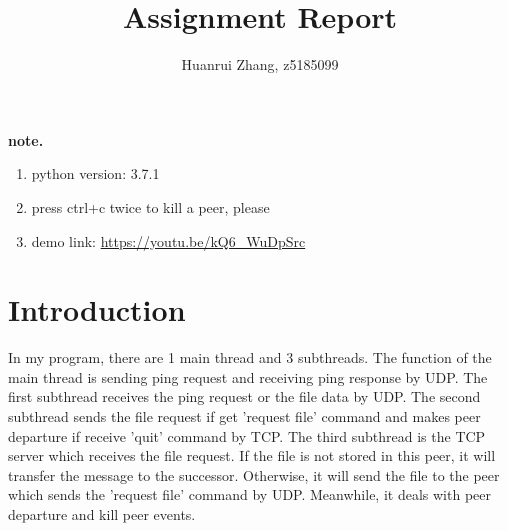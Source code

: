 \documentclass{article}
\begin{document}
	\title{Assignment Report}
	\author{Huanrui Zhang, z5185099}
	\date{}
	\maketitle
	\textbf{note.} \par
	\begin{enumerate}
		\item python version: 3.7.1
		\item press ctrl+c twice to kill a peer, please
		\item demo link: \href{https://youtu.be/kQ6_WuDpSrc}{https://youtu.be/kQ6\_WuDpSrc}
	\end{enumerate}

	\section{Introduction}
		In my program, there are 1 main thread and 3 subthreads. The function of the main thread is sending ping request and receiving ping response by UDP. The first subthread receives the ping request or the file data by UDP. The second subthread sends the file request if get 'request file' command and makes peer departure if receive 'quit' command by TCP. The third subthread is the TCP server which receives the file request. If the file is not stored in this peer, it will transfer the message to the successor. Otherwise, it will send the file to the peer which sends the 'request file' command by UDP. Meanwhile, it deals with peer departure and kill peer events.
	
\end{document}
